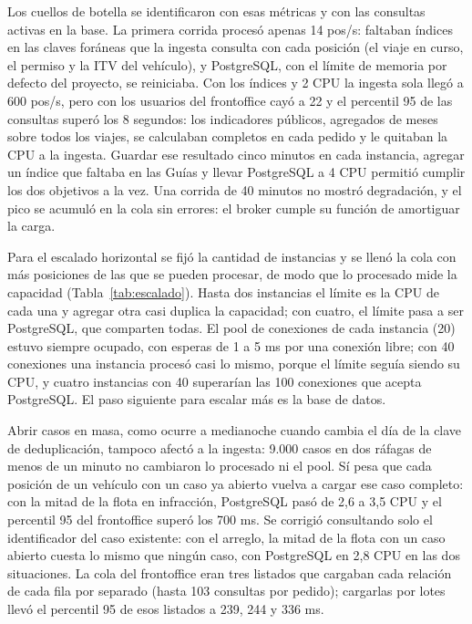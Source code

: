 Los cuellos de botella se identificaron con esas métricas y con las consultas activas en la base. La primera corrida procesó apenas 14 pos/s: faltaban índices en las claves foráneas que la ingesta consulta con cada posición (el viaje en curso, el permiso y la ITV del vehículo), y PostgreSQL, con el límite de memoria por defecto del proyecto, se reiniciaba. Con los índices y 2 CPU la ingesta sola llegó a 600 pos/s, pero con los usuarios del frontoffice cayó a 22 y el percentil 95 de las consultas superó los 8 segundos: los indicadores públicos, agregados de meses sobre todos los viajes, se calculaban completos en cada pedido y le quitaban la CPU a la ingesta. Guardar ese resultado cinco minutos en cada instancia, agregar un índice que faltaba en las Guías y llevar PostgreSQL a 4 CPU permitió cumplir los dos objetivos a la vez. Una corrida de 40 minutos no mostró degradación, y el pico se acumuló en la cola sin errores: el broker cumple su función de amortiguar la carga.

Para el escalado horizontal se fijó la cantidad de instancias y se llenó la cola con más posiciones de las que se pueden procesar, de modo que lo procesado mide la capacidad (Tabla~\ref{tab:escalado}). Hasta dos instancias el límite es la CPU de cada una y agregar otra casi duplica la capacidad; con cuatro, el límite pasa a ser PostgreSQL, que comparten todas. El pool de conexiones de cada instancia (20) estuvo siempre ocupado, con esperas de 1 a 5 ms por una conexión libre; con 40 conexiones una instancia procesó casi lo mismo, porque el límite seguía siendo su CPU, y cuatro instancias con 40 superarían las 100 conexiones que acepta PostgreSQL. El paso siguiente para escalar más es la base de datos.

Abrir casos en masa, como ocurre a medianoche cuando cambia el día de la clave de deduplicación, tampoco afectó a la ingesta: 9.000 casos en dos ráfagas de menos de un minuto no cambiaron lo procesado ni el pool. Sí pesa que cada posición de un vehículo con un caso ya abierto vuelva a cargar ese caso completo: con la mitad de la flota en infracción, PostgreSQL pasó de 2,6 a 3,5 CPU y el percentil 95 del frontoffice superó los 700 ms. Se corrigió consultando solo el identificador del caso existente: con el arreglo, la mitad de la flota con un caso abierto cuesta lo mismo que ningún caso, con PostgreSQL en 2,8 CPU en las dos situaciones. La cola del frontoffice eran tres listados que cargaban cada relación de cada fila por separado (hasta 103 consultas por pedido); cargarlas por lotes llevó el percentil 95 de esos listados a 239, 244 y 336 ms.

